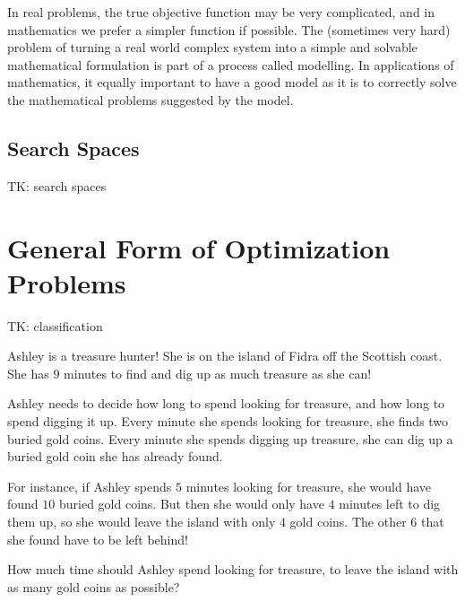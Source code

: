 \documentclass[a4paper,10pt]{report}
\begin{document}
In real problems, the true objective function may be very complicated, and in mathematics we
prefer a simpler function if possible. The (sometimes very hard) problem of turning a real
world complex system into a simple and solvable mathematical formulation is part of a
process called modelling. In applications of mathematics, it equally important to have a
good model as it is to correctly solve the mathematical problems suggested by the model.

\subsection{Search Spaces}

TK: search spaces

\section{General Form of Optimization Problems}

TK: classification

\begin{problem}{3}
  Ashley is a treasure hunter! She is on the island of Fidra off the Scottish coast. She
  has \(9\) minutes to find and dig up as much treasure as she can!

  Ashley needs to decide how long to spend looking for treasure, and how long to spend
  digging it up. Every minute she spends looking for treasure, she finds two buried gold
  coins. Every minute she spends digging up treasure, she can dig up a buried gold coin she
  has already found.

  For instance, if Ashley spends \(5\) minutes looking for treasure, she would have found
  \(10\) buried gold coins. But then she would only have \(4\) minutes left to dig them up,
  so she would leave the island with only \(4\) gold coins. The other \(6\) that she found
  have to be left behind!

  How much time should Ashley spend looking for treasure, to leave the island with as many
  gold coins as possible?
\end{problem}


\printglossaries

\cleardoublepage
{}
\listoffigures
\end{document}
